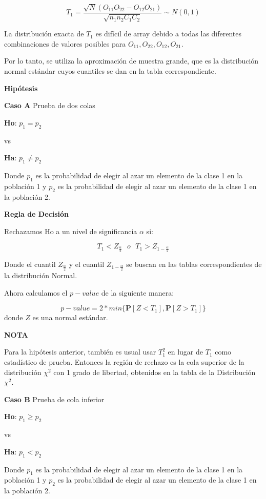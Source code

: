 \documentclass[a4paper,oneside,openany]{book}
\begin{document}
\[T_{1}=\frac{\sqrt{N}(O_{11}O_{22}-O_{12}O_{21})}{\sqrt{n_{1}n_{2}C_{1}C_{2}}}\sim N(0,1)\]

La distribución exacta de \(T_1\) es difícil de array debido a todas las
diferentes combinaciones de valores posibles para
\(O_{11},O_{22},O_{12},O_{21}\).

Por lo tanto, se utiliza la aproximación de muestra grande, que es la
distribución normal estándar cuyos cuantiles se dan en la tabla
correspondiente.

\textbf{Hipótesis}

\textbf{Caso A} Prueba de dos colas

\textbf{Ho}: \(p_{1} = p_{2}\)

vs

\textbf{Ha}: \(p_{1} \neq p_{2}\)

Donde \(p_{1}\) es la probabilidad de elegir al azar un elemento de la
clase 1 en la población 1 y \(p_{2}\) es la probabilidad de elegir al
azar un elemento de la clase 1 en la población 2.

\textbf{Regla de Decisión}

Rechazamos Ho a un nivel de significancia \(\alpha\) si:

\[T_{1}< Z_\frac{\alpha}{2} \ \ \    o  \ \ \  T_{1} > Z_{1-\frac{\alpha}{2}}\]

Donde el cuantil \(Z_\frac{\alpha}{2}\) y el cuantil
\(Z_{1-\frac{\alpha}{2}}\) se buscan en las tablas correspondientes de
la distribución Normal.

Ahora calculamos el \(p-value\) de la siguiente manera:

\[p-value=2*min\{ \mathbf{P}[Z<T_{1}],\mathbf{P}[Z>T_{1}]\}\] donde
\(Z\) es una normal estándar.

\textbf{NOTA}

Para la hipótesis anterior, también es usual usar \(T_{1}^2\) en lugar
de \(T_{1}\) como estadístico de prueba. Entonces la región de rechazo
es la cola superior de la distribución \(\chi^2\) con 1 grado de
libertad, obtenidos en la tabla de la Distribución \(\chi^2\).

\textbf{Caso B} Prueba de cola inferior

\textbf{Ho}: \(p_{1} \geq p_{2}\)

vs

\textbf{Ha}: \(p_{1} < p_{2}\)

Donde \(p_{1}\) es la probabilidad de elegir al azar un elemento de la
clase 1 en la población 1 y \(p_{2}\) es la probabilidad de elegir al
azar un elemento de la clase 1 en la población 2.
\end{document}
